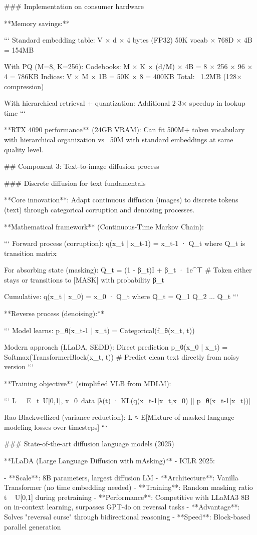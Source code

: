 \documentclass[11pt]{article}
\begin{document}
### Implementation on consumer hardware

**Memory savings:**

```
Standard embedding table: V × d × 4 bytes (FP32)
50K vocab × 768D × 4B = 154MB

With PQ (M=8, K=256):
Codebooks: M × K × (d/M) × 4B = 8 × 256 × 96 × 4 = 786KB
Indices: V × M × 1B = 50K × 8 = 400KB
Total: ~1.2MB (128× compression)

With hierarchical retrieval + quantization:
Additional 2-3× speedup in lookup time
```

**RTX 4090 performance** (24GB VRAM): Can fit 500M+ token vocabulary with hierarchical organization vs ~50M with standard embeddings at same quality level.

## Component 3: Text-to-image diffusion process

### Discrete diffusion for text fundamentals

**Core innovation**: Adapt continuous diffusion (images) to discrete tokens (text) through categorical corruption and denoising processes.

**Mathematical framework** (Continuous-Time Markov Chain):

```
Forward process (corruption):
q(x_t | x_{t-1}) = x_{t-1} · Q_t where Q_t is transition matrix

For absorbing state (masking):
Q_t = (1 - β_t)I + β_t · 1e^⊤
# Token either stays or transitions to [MASK] with probability β_t

Cumulative: q(x_t | x_0) = x_0 · Q̄_t where Q̄_t = Q_1 Q_2 ... Q_t
```

**Reverse process (denoising):**

```
Model learns: p_θ(x_{t-1} | x_t) = Categorical(f_θ(x_t, t))

Modern approach (LLaDA, SEDD): Direct prediction
p_θ(x_0 | x_t) = Softmax(TransformerBlock(x_t, t))
# Predict clean text directly from noisy version
```

**Training objective** (simplified VLB from MDLM):

```
L = E_{t~U[0,1], x_0~data} [λ(t) · KL(q(x_{t-1}|x_t,x_0) || p_θ(x_{t-1}|x_t))]

Rao-Blackwellized (variance reduction):
L ≈ E[Mixture of masked language modeling losses over timesteps]
```

### State-of-the-art diffusion language models (2025)

**LLaDA (Large Language Diffusion with mAsking)** - ICLR 2025:

- **Scale**: 8B parameters, largest diffusion LM
- **Architecture**: Vanilla Transformer (no time embedding needed)
- **Training**: Random masking ratio t ~ U[0,1] during pretraining
- **Performance**: Competitive with LLaMA3 8B on in-context learning, surpasses GPT-4o on reversal tasks
- **Advantage**: Solves "reversal curse" through bidirectional reasoning
- **Speed**: Block-based parallel generation
\end{document}
